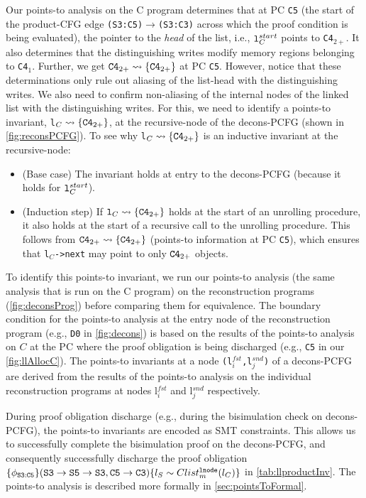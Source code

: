 Our points-to analysis on
the C program determines that at PC {\tt C5} (the start of
the product-CFG edge {\tt (S3:C5)$\rightarrow$(S3:C3)} across which the proof
condition is being evaluated),
the pointer to the {\em head}
of the list, i.e., ${\tt l}^{start}_C$
points to {\tt C4}$_{2+}$. It also determines that the distinguishing
writes modify memory regions belonging to {\tt C4}$_1$. 
Further, we get ${\tt C4}_{2+}\rightsquigarrow{}\{{\tt C4}_{2+}\}$ at PC {\tt C5}.
However,
notice that these determinations only rule out aliasing of the list-head with
the distinguishing writes. We also need to confirm non-aliasing
of the internal nodes of the linked list with the distinguishing
writes.
For this, we need to identify a points-to invariant,
{\tt l}$_C\rightsquigarrow{}\{{\tt C4}_{2+}\}$, at the recursive-node
of the decons-PCFG
(shown in \cref{fig:reconsPCFG}).
To see why {\tt l}$_C\rightsquigarrow{}\{{\tt C4}_{2+}\}$ is
an inductive invariant at the recursive-node:
\begin{itemize}
\item (Base case) The invariant holds
at entry to the decons-PCFG (because it holds for ${\tt l}^{start}_C$).
\item (Induction step) If ${\tt l}_C\rightsquigarrow{}\{{\tt C4}_{2+}\}$
holds at the start of an unrolling procedure,
it also holds at the start of a recursive call to the
unrolling procedure. This
follows from ${\tt C4}_{2+}\rightsquigarrow{}\{{\tt C4}_{2+}\}$ (points-to information at PC {\tt C5}),
which ensures that {\tt l$_C$->next} may point to only ${\tt C4}_{2+}$ objects.
\end{itemize}

To identify this points-to invariant, we run
our points-to analysis (the same analysis that is run
on the C program) on the reconstruction programs (\cref{fig:deconsProg})
before
comparing them for equivalence. The boundary
condition for the points-to analysis at the
entry node of the reconstruction
program (e.g., {\tt D0} in \cref{fig:decons}) is based on
the results of the points-to analysis
on $C$ at the PC where the proof obligation is being discharged (e.g., {\tt C5}
in our \cref{fig:llAllocC}). The points-to invariants
at a node {\tt (l$^{fst}_i$,l$^{snd}_j$)} of a decons-PCFG are
derived from the results of the points-to analysis on the individual
reconstruction programs at nodes l$^{fst}_i$ and l$^{snd}_j$
respectively.

During proof obligation discharge (e.g., during the bisimulation
check on decons-PCFG), the points-to invariants are encoded as SMT constraints.
This allows us to successfully
complete the bisimulation proof on the decons-PCFG, and
consequently successfully discharge the
proof obligation
$\{\phi_{{\tt S3:C5}}\}\\({\tt S3\rightarrow S5\rightarrow S3}, {\tt C5\rightarrow C3}) \{l_{S}\sim{}Clist^{{\tt lnode}}_{m}(l_{C})\}$ in \cref{tab:llproductInv}.
The points-to analysis is described more formally
in \cref{sec:pointsToFormal}.

